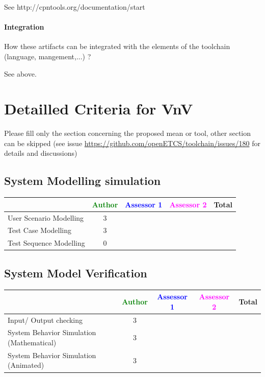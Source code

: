 \begin{author_comment}
   See http://cpntools.org/documentation/start
\end{author_comment}

\paragraph{Integration}
    How these artifacts can be integrated with the elements of the toolchain (language, mangement,...) ?

\begin{author_comment}
   See above.
\end{author_comment}


\section{Detailled Criteria for VnV}

Please  fill only the section concerning the proposed mean or tool, other section can be skipped (see issue \url{https://github.com/openETCS/toolchain/issues/180} for details and discussions)



\subsection{System Modelling simulation}	

\begin{tabular}{|l | c | c | c | c|}
\hline
& \textcolor{green}{Author} & \textcolor{blue}{Assessor 1} & \textcolor{magenta}{Assessor 2} & Total \\
\hline 
User Scenario Modelling & 3& & &  \\
\hline
Test Case Modelling & 3& & &  \\
\hline
Test Sequence Modelling & 0& & &  \\
\hline
\end{tabular}
	
\subsection{System Model Verification}	


\begin{tabular}{|l | c | c | c | c|}
\hline
& \textcolor{green}{Author} & \textcolor{blue}{Assessor 1} & \textcolor{magenta}{Assessor 2} & Total \\
\hline 
Input/ Output checking & 3& & &  \\
\hline
System Behavior Simulation (Mathematical) & 3& & &  \\
\hline
System Behavior Simulation (Animated) & 3& & &  \\
\hline
\end{tabular}


